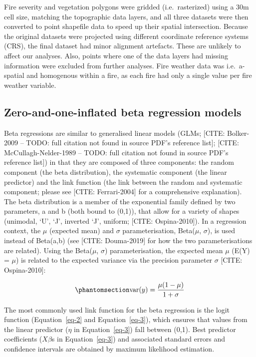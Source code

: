 \documentclass[
  numafflabel,
  authoryear,
  preprint]{elsarticle}
\begin{document}
Fire severity and vegetation polygons were gridded (i.e.~rasterized)
using a 30m cell size, matching the topographic data layers, and all
three datasets were then converted to point shapefile data to speed up
their spatial intersection. Because the original datasets were projected
using different coordinate reference systems (CRS), the final dataset
had minor alignment artefacts. These are unlikely to affect our
analyses. Also, points where one of the data layers had missing
information were excluded from further analyses. Fire weather data was
i.e.~a-spatial and homogenous within a fire, as each fire had only a
single value per fire weather variable.

\subsection{Zero-and-one-inflated beta regression
models}\label{zero-and-one-inflated-beta-regression-models}

Beta regressions are similar to generalised linear models (GLMs;
{[}CITE: Bolker-2009 -- TODO: full citation not found in source PDF's
reference list{]}; {[}CITE: McCullagh-Nelder-1989 -- TODO: full citation
not found in source PDF's reference list{]}) in that they are composed
of three components: the random component (the beta distribution), the
systematic component (the linear predictor) and the link function (the
link between the random and systematic component; please see {[}CITE:
Ferrari-2004{]} for a comprehensive explanation). The beta distribution
is a member of the exponential family defined by two parameters, a and b
(both bound to (0,1)), that allow for a variety of shapes (unimodal,
`U', `J', inverted `J', uniform; {[}CITE: Ospina-2010{]}). In a
regression context, the \(\mu\) (expected mean) and \(\sigma\)
parameterisation, Beta(\(\mu\), \(\sigma\)), is used instead of
Beta(a,b) (see {[}CITE: Douma-2019{]} for how the two parameterisations
are related). Using the Beta(\(\mu\), \(\sigma\)) parameterisation, the
expected mean \(\mu\) (E(Y) = \(\mu\)) is related to the expected
variance via the precision parameter \(\sigma\) {[}CITE: Ospina-2010{]}:

\begin{equation}\phantomsection\label{eq-1}{
\text{var}(y) = \frac{\mu (1 - \mu)}{1 + \sigma}
}\end{equation}

The most commonly used link function for the beta regression is the
logit function (Equation~\ref{eq-2} and Equation~\ref{eq-3}), which
ensures that values from the linear predictor (\(\eta\) in
Equation~\ref{eq-3}) fall between (0,1). Best predictor coefficients
(\(X\beta\)s in Equation~\ref{eq-3}) and associated standard errors and
confidence intervals are obtained by maximum likelihood estimation.
\end{document}
